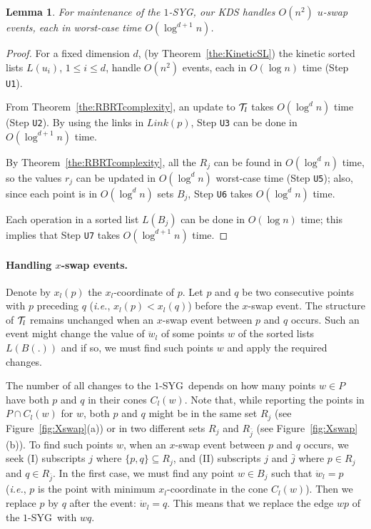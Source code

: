 \documentclass[preprint,12pt]{elsarticle}
\def\1syg{\mbox{$1$-SYG}}
\newcommand{\ie}{\emph{i.e.}}
\newtheorem{lemma}{Lemma}[section]
\begin{document}
\begin{lemma}\label{the:Uswap}
For maintenance of the \1syg, our KDS handles $O(n^2)$ $u$-swap events, each in worst-case time $O(\log^{d+1} n)$.
\end{lemma}
\begin{proof}
For a fixed dimension $d$, (by Theorem~\ref{the:KineticSL}) the kinetic sorted lists $L(u_i)$, $1\leq i \leq d$, handle $O(n^2)$ events, each in $O(\log n)$ time (Step \texttt{U1}). 

From Theorem~\ref{the:RBRTcomplexity}, an update to ${\cal T}_l$ takes $O(\log^d n)$ time (Step \texttt{U2}). By using the links in $Link(p)$, Step \texttt{U3} can be done in $O(\log^{d+1} n)$ time. 

By Theorem~\ref{the:RBRTcomplexity}, all the $R_j$ can be found in $O(\log^d n)$ time, so the values $r_j$ can be updated in $O(\log^d n)$ worst-case time  (Step \texttt{U5}); also, since each point is in $O(\log^dn)$ sets $B_j$, Step \texttt{U6} takes $O(\log^d n)$ time. 

Each operation in a sorted list $L(B_j)$ can be done in $O(\log n)$ time; this implies that Step \texttt{U7} takes $O(\log^{d+1} n)$ time.
\end{proof}

\paragraph{Handling $x$-swap events.} Denote by $x_l(p)$ the $x_l$-coordinate of $p$. Let $p$ and $q$ be two consecutive points with $p$ preceding $q$ (\ie, $x_l(p)<x_l(q)$) before the $x$-swap event. The structure of ${\cal T}_l$ remains unchanged when an $x$-swap event between $p$ and $q$ occurs. Such an event might change the value of $\ddot{w}_l$ of some points $w$ of the sorted lists $L(B(.))$ and if so, we must find such points $w$ and apply the required changes. 

The number of all changes to the \1syg~depends on how many points $w\in P$ have both $p$ and $q$ in their cones $C_l(w)$. Note that, while reporting the points in $P\cap C_l(w)$ for $w$, both $p$ and $q$ might be in the same set $R_j$ (see Figure~\ref{fig:Xswap}(a)) or in two different sets $R_j$ and $R_{\bar{j}}$ (see Figure~\ref{fig:Xswap}(b)). To find such points $w$, when an $x$-swap event between $p$ and $q$ occurs, we seek (I) subscripts $j$ where $\{p,q\}\subseteq R_j$, and (II) subscripts $j$ and $\bar{j}$ where $p\in R_j$ and $q\in R_{\bar{j}}$. In the first case, we must find any point $w\in B_j$ such that $\ddot{w}_l=p$ (\ie, $p$ is the point with minimum $x_l$-coordinate in the cone $C_l(w)$). Then we replace $p$ by $q$ after the event: $\ddot{w}_l=q$. This means that we replace the edge $wp$ of the \1syg~with $wq$. 
\end{document}
